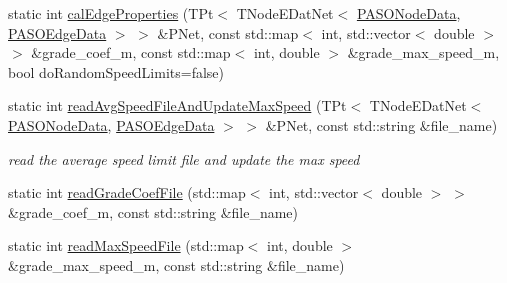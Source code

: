 \begin{DoxyCompactItemize}
\item 
static int \hyperlink{class_p_a_s_o_util_ade2808c1a4bb43735ddfa2c3cef4d711}{cal\+Edge\+Properties} (T\+Pt$<$ T\+Node\+E\+Dat\+Net$<$ \hyperlink{class_p_a_s_o_node_data}{P\+A\+S\+O\+Node\+Data}, \hyperlink{class_p_a_s_o_edge_data}{P\+A\+S\+O\+Edge\+Data} $>$ $>$ \&P\+Net, const std\+::map$<$ int, std\+::vector$<$ double $>$ $>$ \&grade\+\_\+coef\+\_\+m, const std\+::map$<$ int, double $>$ \&grade\+\_\+max\+\_\+speed\+\_\+m, bool do\+Random\+Speed\+Limits=false)
\item 
static int \hyperlink{class_p_a_s_o_util_a48376ac2e245960c957a0d0da1f49464}{read\+Avg\+Speed\+File\+And\+Update\+Max\+Speed} (T\+Pt$<$ T\+Node\+E\+Dat\+Net$<$ \hyperlink{class_p_a_s_o_node_data}{P\+A\+S\+O\+Node\+Data}, \hyperlink{class_p_a_s_o_edge_data}{P\+A\+S\+O\+Edge\+Data} $>$ $>$ \&P\+Net, const std\+::string \&file\+\_\+name)
\begin{DoxyCompactList}\small\item\em read the average speed limit file and update the max speed \end{DoxyCompactList}\item 
static int \hyperlink{class_p_a_s_o_util_ab6c049220ad6c0214c041820ada29b81}{read\+Grade\+Coef\+File} (std\+::map$<$ int, std\+::vector$<$ double $>$ $>$ \&grade\+\_\+coef\+\_\+m, const std\+::string \&file\+\_\+name)
\item 
\hypertarget{class_p_a_s_o_util_a23506c3d10fbbd005f3faddfb68b985a}{}static int \hyperlink{class_p_a_s_o_util_a23506c3d10fbbd005f3faddfb68b985a}{read\+Max\+Speed\+File} (std\+::map$<$ int, double $>$ \&grade\+\_\+max\+\_\+speed\+\_\+m, const std\+::string \&file\+\_\+name)\label{class_p_a_s_o_util_a23506c3d10fbbd005f3faddfb68b985a}


\end{DoxyCompactItemize}
